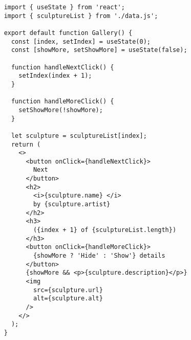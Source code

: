 \begin{verbatim}
    import { useState } from 'react';
    import { sculptureList } from './data.js';
    
    export default function Gallery() {
      const [index, setIndex] = useState(0);
      const [showMore, setShowMore] = useState(false);
    
      function handleNextClick() {
        setIndex(index + 1);
      }
    
      function handleMoreClick() {
        setShowMore(!showMore);
      }
    
      let sculpture = sculptureList[index];
      return (
        <>
          <button onClick={handleNextClick}>
            Next
          </button>
          <h2>
            <i>{sculpture.name} </i> 
            by {sculpture.artist}
          </h2>
          <h3>  
            ({index + 1} of {sculptureList.length})
          </h3>
          <button onClick={handleMoreClick}>
            {showMore ? 'Hide' : 'Show'} details
          </button>
          {showMore && <p>{sculpture.description}</p>}
          <img 
            src={sculpture.url} 
            alt={sculpture.alt}
          />
        </>
      );
    }
\end{verbatim}
